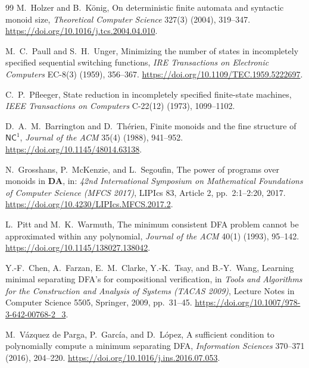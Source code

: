 \documentclass[10pt,a4paper]{ltjsarticle}
\theoremstyle{definition}
\theoremstyle{remark}
\begin{document}
\begin{thebibliography}{99}
M.~Holzer and B.~K{\"o}nig,
\newblock On deterministic finite automata and syntactic monoid size,
\newblock \emph{Theoretical Computer Science} 327(3) (2004), 319--347.
\newblock \url{https://doi.org/10.1016/j.tcs.2004.04.010}.

M.~C.~Paull and S.~H.~Unger,
\newblock Minimizing the number of states in incompletely specified sequential switching functions,
\newblock \emph{IRE Transactions on Electronic Computers} EC-8(3) (1959), 356--367.
\newblock \url{https://doi.org/10.1109/TEC.1959.5222697}.

C.~P.~Pfleeger,
\newblock State reduction in incompletely specified finite-state machines,
\newblock \emph{IEEE Transactions on Computers} C-22(12) (1973), 1099--1102.

D.~A.~M.~Barrington and D.~Th{\'e}rien,
\newblock Finite monoids and the fine structure of $\mathsf{NC}^{1}$,
\newblock \emph{Journal of the ACM} 35(4) (1988), 941--952.
\newblock \url{https://doi.org/10.1145/48014.63138}.

N.~Grosshans, P.~McKenzie, and L.~Segoufin,
\newblock The power of programs over monoids in $\mathbf{DA}$,
\newblock in: \emph{42nd International Symposium on Mathematical Foundations of Computer Science (MFCS 2017)},
LIPIcs 83, Article 2, pp.~2:1--2:20, 2017.
\newblock \url{https://doi.org/10.4230/LIPIcs.MFCS.2017.2}.


L.~Pitt and M.~K.~Warmuth,
\newblock The minimum consistent DFA problem cannot be approximated within any polynomial,
\newblock \emph{Journal of the ACM} 40(1) (1993), 95--142.
\newblock \url{https://doi.org/10.1145/138027.138042}.

Y.-F.~Chen, A.~Farzan, E.~M.~Clarke, Y.-K.~Tsay, and B.-Y.~Wang,
\newblock Learning minimal separating DFA's for compositional verification,
\newblock in \emph{Tools and Algorithms for the Construction and Analysis of
Systems (TACAS 2009)}, Lecture Notes in Computer Science 5505,
Springer, 2009, pp.~31--45.
\newblock \url{https://doi.org/10.1007/978-3-642-00768-2_3}.

M.~V\'azquez de Parga, P.~Garc\'ia, and D.~L\'opez,
\newblock A sufficient condition to polynomially compute a minimum separating DFA,
\newblock \emph{Information Sciences} 370--371 (2016), 204--220.
\newblock \url{https://doi.org/10.1016/j.ins.2016.07.053}.


\end{thebibliography}
\end{document}
